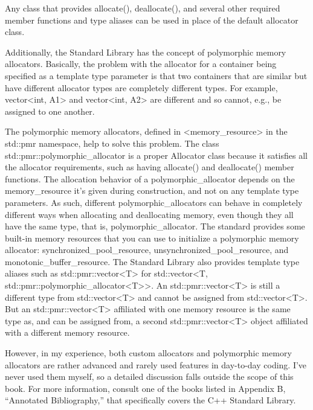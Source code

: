 Any class that provides allocate(), deallocate(), and several other required member functions and type aliases can be used in place of the default allocator class.

Additionally, the Standard Library has the concept of polymorphic memory allocators. Basically, the problem with the allocator for a container being specified as a template type parameter is that two containers that are similar but have different allocator types are completely different types. For example, vector<int, A1> and vector<int, A2> are different and so cannot, e.g., be assigned to one another.

The polymorphic memory allocators, defined in <memory\_resource> in the std::pmr namespace, help to solve this problem. The class std::pmr::polymorphic\_allocator is a proper Allocator class because it satisfies all the allocator requirements, such as having allocate() and deallocate() member functions. The allocation behavior of a polymorphic\_allocator depends on the memory\_resource it’s given during construction, and not on any template type parameters. As such, different polymorphic\_allocators can behave in completely different ways when allocating and deallocating memory, even though they all have the same type, that is, polymorphic\_allocator. The standard provides some built-in memory resources that you can use to initialize a polymorphic memory allocator: synchronized\_pool\_resource, unsynchronized\_pool\_resource, and monotonic\_buffer\_resource. The Standard Library also provides template type aliases such as std::pmr::vector<T> for std::vector<T, std::pmr::polymorphic\_allocator<T>>. An std::pmr::vector<T> is still a different type from std::vector<T> and cannot be assigned from std::vector<T>. But an std::pmr::vector<T> affiliated with one memory resource is the same type as, and can be assigned from, a second std::pmr::vector<T> object affiliated with a different memory resource.

However, in my experience, both custom allocators and polymorphic memory allocators are rather advanced and rarely used features in day-to-day coding. I’ve never used them myself, so a detailed discussion falls outside the scope of this book. For more information, consult one of the books listed in Appendix B, “Annotated Bibliography,” that specifically covers the C++ Standard Library.



















